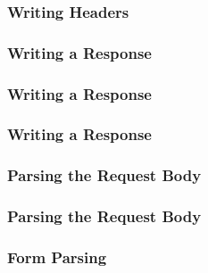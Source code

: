 \begin{frame}
  \frametitle{Writing Headers}
  
\end{frame}

\begin{frame}
  \frametitle{Writing a Response}
  
\end{frame}

\begin{frame}
  \frametitle{Writing a Response}
  
\end{frame}

\begin{frame}
  \frametitle{Writing a Response}
  
\end{frame}

\begin{frame}
  \frametitle{Parsing the Request Body}
  
\end{frame}

\begin{frame}
  \frametitle{Parsing the Request Body}
  
\end{frame}

\begin{frame}
\end{frame}

\begin{frame}
  \frametitle{Form Parsing}
  
\end{frame}


